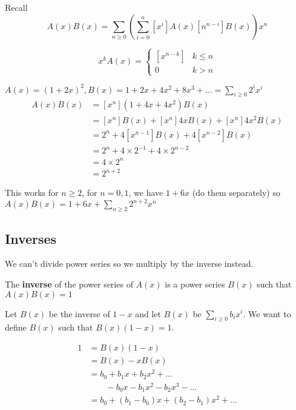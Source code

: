 \documentclass{article}
\begin{document}
Recall
$$A(x)B(x) = \sum_{n \geq 0}(\sum_{i = 0}^{n}[x^i]A(x)[n^{n-i}]B(x))x^n$$

\begin{displaymath}
	[x^n]x^kA(x) = \left\{
	\begin{array}{lr}
		[x^{n-k}] & k \le n\\
		0 & k > n
	\end{array}
	\right.
\end{displaymath}


\example
$A(x) = (1+2x)^2, B(x) = 1 + 2x + 4x^2 + 8x^3 + \dots = \sum_{i \geq 0}2^ix^i$\\

\begin{align*}
[x^n]A(x)B(x) &= [x^n](1+4x+4x^2)B(x)\\
			  & = [x^n]B(x) + [x^n]4xB(x) + [x^n]4x^2B(x)\\
			  & = 2^n + 4[x^{n-1}]B(x) + 4[x^{n-2}]B(x)\\
			  & = 2^n + 4 \times 2^{-1} + 4 \times 2^{n-2}\\
			  & = 4 \times 2^n\\
			  & = 2^{n+2}
\end{align*}

This works for $n \ge 2$, for $n=0,1$, we have $1+6x$ (do them separately) so $A(x)B(x) = 1 + 6x + \sum_{n \ge 2}2^{n+2}x^n$

\subsection{Inverses}
We can't divide power series so we multiply by the inverse instead.

\begin{defn}
	The \textbf{inverse} of the power series of $A(x)$ is a power series $B(x)$ such that $A(x)B(x) = 1$
\end{defn}

Let $B(x)$ be the inverse of $1-x$ and let $B(x)$ be $\sum_{i \geq 0} b_ix^i$. We want to define $B(x)$ such that $B(x)(1-x)=1$.

\begin{align*}
	1 & = B(x)(1-x)\\
	  & = B(x) - xB(x)\\
	  & = b_0 + b_1x + b_2x^2 + \dots \\
	  &  \qquad -b_0x - b_1x^2 - b_2x^3 - \dots \\
	  & = b_0 + (b_1 - b_0)x + (b_2 - b_1)x^2 + \dots 
\end{align*}
\end{document}
